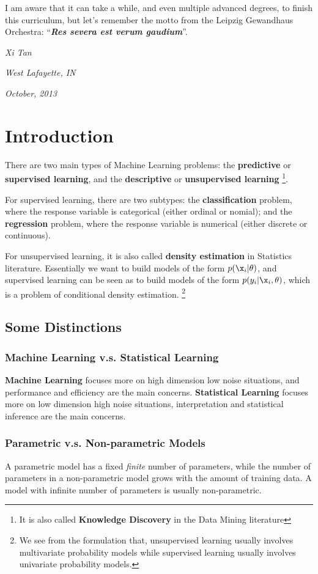 \documentclass{book}
\begin{document}
I am aware that it can take a while, and even multiple advanced degrees, to finish this curriculum, but let's remember the motto from the Leipzig Gewandhaus Orchestra: ``{\bf{\em{Res severa est verum gaudium}}}''.

\vspace{10mm}
\hfill {\em{Xi Tan}}

\hfill {\em{West Lafayette, IN}}

\hfill {\em{October, 2013}}

\newpage


\chapter{Introduction}
There are two main types of Machine Learning problems: the {\bf{predictive}} or {\bf{supervised learning}}, and the {\bf{descriptive}} or {\bf{unsupervised learning}} \footnote{It is also called {\bf{Knowledge Discovery}} in the Data Mining literature}.

For supervised learning, there are two subtypes: the {\bf{classification}} problem, where the response variable is categorical (either ordinal or nomial); and the {\bf{regression}} problem, where the response variable is numerical (either discrete or continuous).

For unsupervised learning, it is also called {\bf{density estimation}} in Statistics literature. Essentially we want to build models of the form $p(\x_i|\theta)$, and supervised learning can be seen as to build models of the form $p(y_i|\x_i,\theta)$, which is a problem of conditional density estimation. \footnote{We see from the formulation that, unsupervised learning usually involves multivariate probability models while supervised learning usually involves univariate probability models.}


\section{Some Distinctions}
\subsection{Machine Learning v.s. Statistical Learning}
{\bf{Machine Learning}} focuses more on high dimension low noise situations, and performance and efficiency are the main concerns. {\bf{Statistical Learning}} focuses more on low dimension high noise situations, interpretation and statistical inference are the main concerns.
\subsection{Parametric v.s. Non-parametric Models}
A parametric model has a fixed {\em{finite}} number of parameters, while the number of parameters in a non-parametric model grows with the amount of training data. A model with infinite number of parameters is usually non-parametric.
\end{document}
